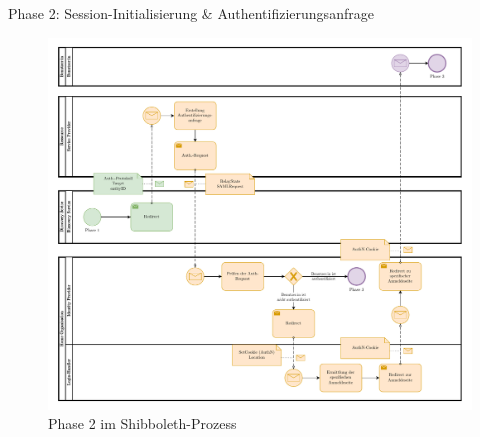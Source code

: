 \begin{frame}{Phase 2: Session-Initialisierung \& Authentifizierungsanfrage}

    \begin{figure}
        \includegraphics[height=0.7\paperheight]{../assets/bis_bpmn_phase_2.drawio.pdf}
        \caption{Phase 2 im Shibboleth-Prozess~\cite[vgl.][]{switchExpertDemoSWITCHaai2024a}}
    \end{figure}
\end{frame}


